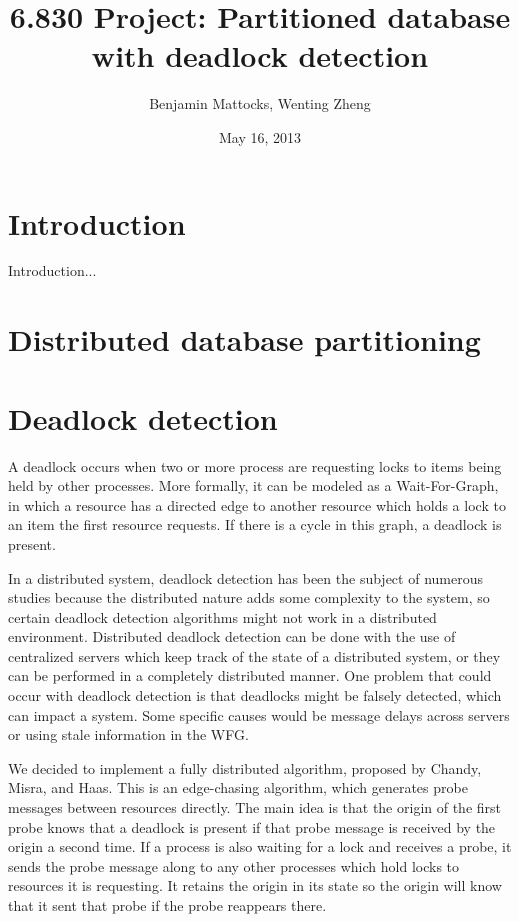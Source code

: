 \documentclass[a4paper, 10pt, notitlepage]{report}
\title{6.830 Project: Partitioned database with deadlock detection} %
\author{Benjamin Mattocks, Wenting Zheng} %
\date{May 16, 2013} %
\begin{document}
\maketitle
\thispagestyle{empty}
\newpage


%
\section*{Introduction}
Introduction...

\section*{Distributed database partitioning}

\section*{Deadlock detection}

A deadlock occurs when two or more process are requesting locks to items being held by other processes. More formally, it can be modeled as a Wait-For-Graph, in which a resource has a directed edge to another resource which holds a lock to an item the first resource requests. If there is a cycle in this graph, a deadlock is present.

In a distributed system, deadlock detection has been the subject of numerous studies because the distributed nature adds some complexity to the system, so certain deadlock detection algorithms might not work in a distributed environment. Distributed deadlock detection can be done with the use of centralized servers which keep track of the state of a distributed system, or they can be performed in a completely distributed manner. One problem that could occur with deadlock detection is that deadlocks might be falsely detected, which can impact a system. Some specific causes would be message delays across servers or using stale information in the WFG.

We decided to implement a fully distributed algorithm, proposed by Chandy, Misra, and Haas. This is an edge-chasing algorithm, which generates probe messages between resources directly. The main idea is that the origin of the first probe knows that a deadlock is present if that probe message is received by the origin a second time. If a process is also waiting for a lock and receives a probe, it sends the probe message along to any other processes which hold locks to resources it is requesting. It retains the origin in its state so the origin will know that it sent that probe if the probe reappears there.
\end{document}
